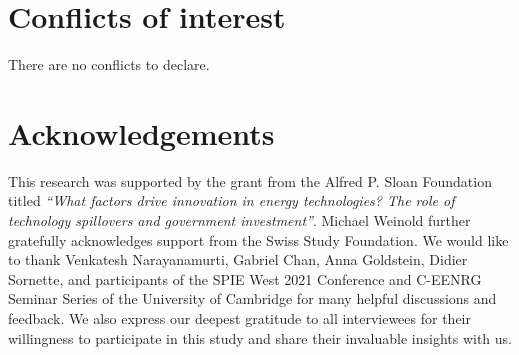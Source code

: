 \documentclass[twoside,twocolumn,9pt]{article}
\renewcommand{\refname}{Notes and references}
\begin{document}
\section*{Conflicts of interest}

There are no conflicts to declare.

\section*{Acknowledgements}
This research was supported by the grant from the Alfred P. Sloan Foundation titled \textit{“What factors drive innovation in energy technologies? The role of technology spillovers and government investment”}. Michael Weinold further gratefully acknowledges support from the Swiss Study Foundation. We would like to thank Venkatesh Narayanamurti, Gabriel Chan, Anna Goldstein, Didier Sornette, and participants of the SPIE West 2021 Conference and C-EENRG Seminar Series of the University of Cambridge for many helpful discussions and feedback. We also express our deepest gratitude to all interviewees for their willingness to participate in this study and share their invaluable insights with us. 



\balance



\end{document}
